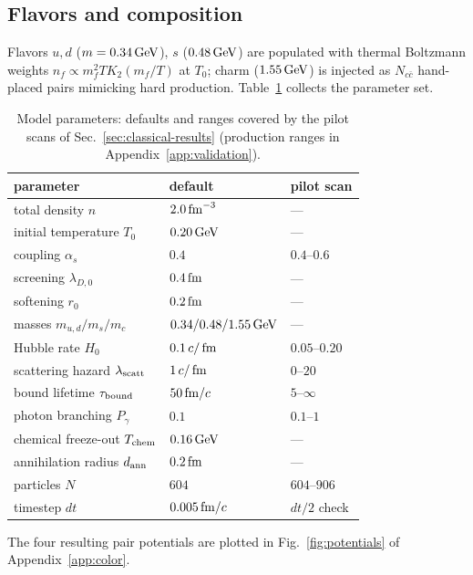 \subsection{Flavors and composition}

Flavors $u,d$ ($m=0.34\,\mathrm{GeV}$), $s$ ($0.48\,\mathrm{GeV}$) are populated with thermal
Boltzmann weights $n_f \propto m_f^2 T K_2(m_f/T)$ at $T_0$; charm
($1.55\,\mathrm{GeV}$) is injected as $N_{c\bar c}$ hand-placed pairs mimicking hard
production.  Table~\ref{tab:params} collects the parameter set.

\begin{table}[t]
\caption{Model parameters: defaults and ranges covered by the pilot
scans of Sec.~\ref{sec:classical-results} (production ranges in
Appendix~\ref{app:validation}).}
\label{tab:params}
\begin{ruledtabular}
\begin{tabular}{lll}
parameter & default & pilot scan \\
\hline
total density $n$ & $2.0\,\mathrm{fm}^{-3}$ & --- \\
initial temperature $T_0$ & $0.20\,\mathrm{GeV}$ & --- \\
coupling $\alpha_s$ & $0.4$ & $0.4$--$0.6$ \\
screening $\lambda_{D,0}$ & $0.4\,\mathrm{fm}$ & --- \\
softening $r_0$ & $0.2\,\mathrm{fm}$ & --- \\
masses $m_{u,d}/m_s/m_c$ & $0.34/0.48/1.55\,\mathrm{GeV}$ & --- \\
Hubble rate $H_0$ & $0.1\,c/\,\mathrm{fm}$ & $0.05$--$0.20$ \\
scattering hazard $\lambda_{\rm scatt}$ & $1\,c/\,\mathrm{fm}$ & $0$--$20$ \\
bound lifetime $\tau_{\rm bound}$ & $50\,\mathrm{fm}/c$ & $5$--$\infty$ \\
photon branching $P_\gamma$ & $0.1$ & $0.1$--$1$ \\
chemical freeze-out $T_{\mathrm{chem}}$ & $0.16\,\mathrm{GeV}$ & --- \\
annihilation radius $d_{\rm ann}$ & $0.2\,\mathrm{fm}$ & --- \\
particles $N$ & $604$ & $604$--$906$ \\
timestep $dt$ & $0.005\,\mathrm{fm}/c$ & $dt/2$ check \\
\end{tabular}
\end{ruledtabular}
\end{table}

The four resulting pair potentials are plotted in
Fig.~\ref{fig:potentials} of Appendix~\ref{app:color}.
